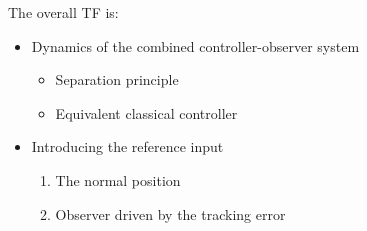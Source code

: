 \ifslidesonly
\begin{slide}
   \begin{center}
\end{center}
\end{slide}
\fi


\ifslidesonly
\begin{slide}
   
\end{slide}
\fi


\ifslidesonly
\begin{slide}
   
\end{slide}
\fi


\ifslidesonly
\begin{slide}
   
\end{slide}
\fi

The overall TF is:

\ifslidesonly
\begin{slide}
   
\end{slide}
\fi


\ifslidesonly
\begin{slide}
   
\end{slide}
\fi



\ifslidesonly
\begin{slide}
   \begin{itemize}
   	\item Dynamics of the combined controller-observer system
\begin{itemize}
	\item Separation principle
	\item Equivalent classical controller
\end{itemize}
\item Introducing the reference input
\begin{enumerate}
	\item The normal position
	\item Observer driven by the tracking error
\end{enumerate}
   \end{itemize}
\end{slide}
\fi






\endinput

